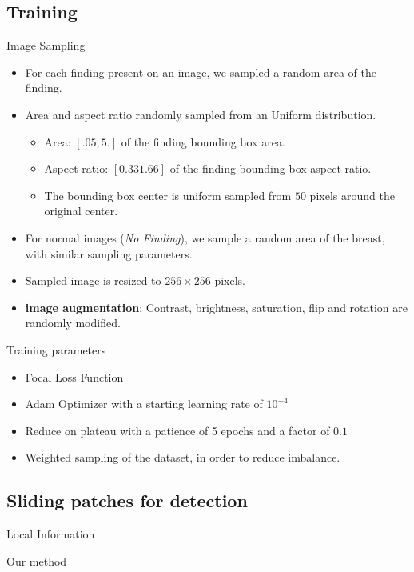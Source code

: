 \subsection{Training}
\begin{frame}{Image Sampling}
    \begin{itemize}
        \item For each finding present on an image, we sampled a random area of the finding.
        \item Area and aspect ratio randomly sampled from an Uniform distribution.
        \begin{itemize}
            \item Area: $[.05, 5.]$ of the finding bounding box area.
            \item Aspect ratio: $[0.33 1.66]$ of the finding bounding box aspect ratio.
            \item The bounding box center is uniform sampled from $50$ pixels around the original center.
        \end{itemize}
        \item For normal images (\emph{No Finding}), we sample a random area of the breast, with similar sampling parameters.
        \item Sampled image is resized to $256 \times 256$ pixels.
        \item \textbf{image augmentation}: Contrast, brightness, saturation, flip and rotation are randomly modified.
    \end{itemize}
\end{frame}

\begin{frame}{Training parameters}
    \begin{itemize}
        \item Focal Loss Function 
        \item Adam Optimizer with a starting learning rate of $10^{-4}$
        \item Reduce on plateau with a patience of 5 epochs and a factor of $0.1$
        \item Weighted sampling of the dataset, in order to reduce imbalance.
    \end{itemize}
\end{frame}

\subsection{Sliding patches for detection}
\begin{frame}{Local Information}
    
\end{frame}

\begin{frame}{Our method}
    
\end{frame}
